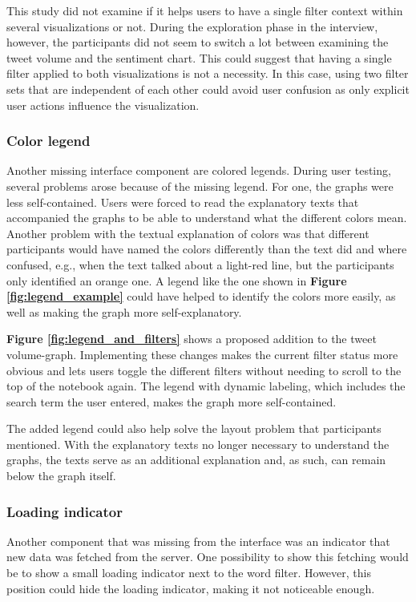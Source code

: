 This study did not examine if it helps users to have a single filter context within several visualizations or not. During the exploration phase in the interview, however, the participants did not seem to switch a lot between examining the tweet volume and the sentiment chart. This could suggest that having a single filter applied to both visualizations is not a necessity. In this case, using two filter sets that are independent of each other could avoid user confusion as only explicit user actions influence the visualization.

\subsubsection*{Color legend}
Another missing interface component are colored legends. During user testing, several problems arose because of the missing legend. For one, the graphs were less self-contained. Users were forced to read the explanatory texts that accompanied the graphs to be able to understand what the different colors mean. Another problem with the textual explanation of colors was that different participants would have named the colors differently than the text did and where confused, e.g., when the text talked about a light-red line, but the participants only identified an orange one. A legend like the one shown in \textbf{Figure \ref{fig:legend_example}} could have helped to identify the colors more easily, as well as making the graph more self-explanatory.

\textbf{Figure \ref{fig:legend_and_filters}} shows a proposed addition to the tweet volume-graph. Implementing these changes makes the current filter status more obvious and lets users toggle the different filters without needing to scroll to the top of the notebook again. The legend with dynamic labeling, which includes the search term the user entered, makes the graph more self-contained.

The added legend could also help solve the layout problem that participants mentioned. With the explanatory texts no longer necessary to understand the graphs, the texts serve as an additional explanation and, as such, can remain below the graph itself.

\subsubsection*{Loading indicator}
Another component that was missing from the interface was an indicator that new data was fetched from the server. One possibility to show this fetching would be to show a small loading indicator next to the word filter. However, this position could hide the loading indicator, making it not noticeable enough.

